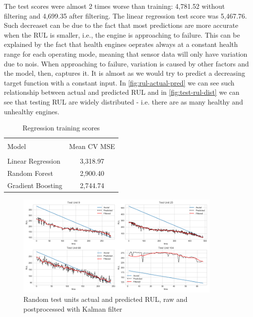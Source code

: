 \documentclass[letterpaper, 10 pt, conference, onecolumn]{ieeeconf}  %
\begin{document}
The test scores were almost 2 times worse than training: 4,781.52 without filtering and 4,699.35 after filtering. The linear regression test score was 5,467.76. Such decreaset can be due to the fact that most predictions are more accurate when the RUL is smaller, i.e., the engine is approaching to failure. This can be explained by the fact that health engines oeprates always at a constant health range for each operating mode, meaning that sensor data will only have variation due to nois. When approaching to failure, variation is caused by other factors and the model, then, captures it. It is almost as we would try to predict a decreasing target function with a constant input. In \autoref{fig:rul-actual-pred} we can see such relationship between actual and predicted RUL and in \autoref{fig:test-rul-dist} we can see that testing RUL are widely distributed - i.e. there are as many healthy and unhealthy engines.

\begin{table}[!h]
    \centering
    \begin{tabular}{l|c}
        \hline 
        \hline \\[-1.8ex] 
        Model & Mean CV MSE \\
        \hline \\[-1.8ex] 
         Linear Regression & 3,318.97 \\
         Random Forest & 2,900.40 \\
         Gradient Boosting & 2,744.74 \\
         \hline
         \hline
    \end{tabular}
    \caption{Regression training scores}
    \label{tab:reg-train-scores}
\end{table}

\begin{figure}[!h]
    \centering
    \includegraphics[width=0.9\textwidth]{plots/reg_test_units_pred.png}
    \caption{Random test units actual and predicted RUL, raw and postprocessed with Kalman filter}
    \label{fig:test-preds-reg}
\end{figure}
\end{document}
